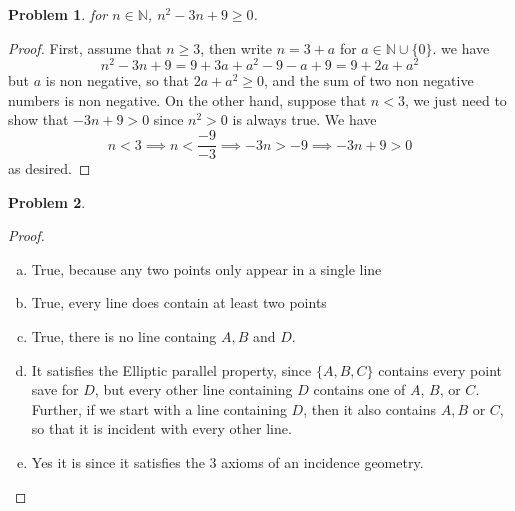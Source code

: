 \documentclass{article}
\newcommand{\N}{\mathbb{N}}
\newtheorem{prb}{Problem}
\begin{document}
	   \begin{prb}  for $n \in \N$, $n^2 -3n + 9\geq 0$. \end{prb} 
	   \begin{proof} 
		   First, assume that $n \geq 3$, then write $n = 3 + a$ for $a \in \N \cup \{0\}$. 
		   we have 
		   \[ n^2 -3n + 9 = 9 + 3a + a^2 - 9 - a + 9 = 9 + 2a + a^2 \] 
		   but $a$ is non negative, so that $2a + a^2 \geq 0$, and the sum of two non negative numbers 
		   is non negative. 
		   On the other hand, suppose that $n < 3$, we just need to show that $-3n + 9 > 0$ since
		$n^2 > 0$ is always true. We have 
		\[ n < 3 \implies n < \frac{-9}{-3} \implies -3n > -9 \implies -3n + 9 > 0 \] 
		as desired. 
	   \end{proof} 
	

	   \begin{prb}  \end{prb} 
	   \begin{proof} 
	   	\begin{enumerate}[(a)]
	   		\item True, because any two points only appear in a single line
				\item  True, every line does contain at least two points 
				\item True, there is no line containg $A, B$ and $D$.
				\item It satisfies the Elliptic parallel property, 
					since $\{A, B, C\}$ contains every point save for $D$, 
					but every other line containing $D$ contains one of $A$, $B$, or $C$. 
					Further, if we start with a line containing $D$, then it also 
					contains $A, B$ or $C$, so that it is incident with every other line. 
				\item Yes it is since it satisfies the 3 axioms of an incidence geometry. 
	   	\end{enumerate}
	   \end{proof} 
\end{document}
